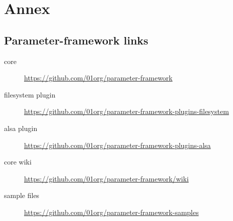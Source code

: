\chapter*{Annex}\label{chap:annex}

\section*{Parameter-framework links}
\begin{description}
    \item[core] \url{https://github.com/01org/parameter-framework}
    \item[filesystem plugin] \url{https://github.com/01org/parameter-framework-plugins-filesystem}
    \item[alsa plugin] \url{https://github.com/01org/parameter-framework-plugins-alsa}
    \item[core wiki] \url{https://github.com/01org/parameter-framework/wiki}
    \item[sample files] \url{https://github.com/01org/parameter-framework-samples}
\end{description}

